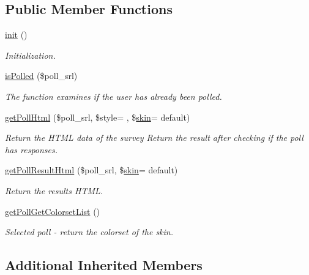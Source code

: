 \subsection*{Public Member Functions}
\begin{DoxyCompactItemize}
\item 
\hyperlink{classpollModel_a201866e44c1ba55917c57b15ae37f984}{init} ()
\begin{DoxyCompactList}\small\item\em Initialization. \end{DoxyCompactList}\item 
\hyperlink{classpollModel_a2364a327ffba2641db0722cdcf0c40d7}{is\+Polled} (\$poll\+\_\+srl)
\begin{DoxyCompactList}\small\item\em The function examines if the user has already been polled. \end{DoxyCompactList}\item 
\hyperlink{classpollModel_adf54e16d01ff98966cfc330c667b9898}{get\+Poll\+Html} (\$poll\+\_\+srl, \$style= \textquotesingle{}\textquotesingle{}, \$\hyperlink{ko_8install_8php_ab0f2b49fdb57754496b34f6b880cdeaf}{skin}= \textquotesingle{}default\textquotesingle{})
\begin{DoxyCompactList}\small\item\em Return the H\+T\+ML data of the survey Return the result after checking if the poll has responses. \end{DoxyCompactList}\item 
\hyperlink{classpollModel_a2353dcbc141fa99d8fe05b223f738372}{get\+Poll\+Result\+Html} (\$poll\+\_\+srl, \$\hyperlink{ko_8install_8php_ab0f2b49fdb57754496b34f6b880cdeaf}{skin}= \textquotesingle{}default\textquotesingle{})
\begin{DoxyCompactList}\small\item\em Return the result\textquotesingle{}s H\+T\+ML. \end{DoxyCompactList}\item 
\hyperlink{classpollModel_a350de71f668751cd553fc60aca3fa72c}{get\+Poll\+Get\+Colorset\+List} ()
\begin{DoxyCompactList}\small\item\em Selected poll -\/ return the colorset of the skin. \end{DoxyCompactList}\end{DoxyCompactItemize}
\subsection*{Additional Inherited Members}


